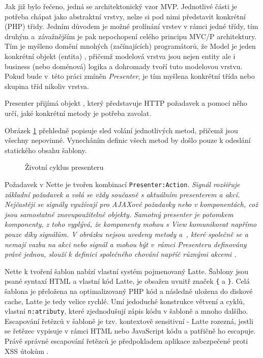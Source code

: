 Jak již bylo řečeno, jedná se architektonický vzor MVP. 
Jednotlivé části je potřeba chápat jako abstraktní vrstvy, nelze si pod nimi představit konkrétní (PHP) třidy. Jedním důvodem je možné prolínání vrstev v rámci jedné třídy, tím druhým a~závažnějším je pak nepochopení celého principu MVC/P architektury. Tím je myšleno domění mnohých (začínajících) programátorů, že Model je jeden konkrétní objekt (entita) \cite{MVCmodel}, přičemž modelová vrstva jsou nejen entity ale i business (nebo doménová) logika a dohromady tvoří tuto modelovou vrstvu. Pokud bude v~této práci zmíněn \textit{Presenter}, je tím myšlena konkrétní třída nebo skupina tříd nikoliv vrstva.


Presenter přijímá objekt , který představuje HTTP požadavek a pomocí něho určí, jaké konkrétní metody je potřeba zavolat. 

Obrázek \ref{fig:zivotniCyklusPresenteru} přehledně popisuje sled volání jednotlivých metod, přičemž jsou všechny nepovinné. Vynecháním definic všech metod by došlo pouze k odeslání statického obsahu šablony.

\begin{figure}[h]
		\centering \footnotesize {}\selectfont
		
		\normalsize \sffamily
		\captionsetup{width=\linewidth}
		\caption[Životní cyklus presenteru]{Životní cyklus presenteru \cite{NetteDocs}}
		\label{fig:zivotniCyklusPresenteru}
\end{figure}

Požadavek v Nette je tvořen kombinací \texttt{Presenter:Action}. \it{Signál} rozšiřuje základní požadavek a volá se vždy současně s aktuálním presenterem a akcí. Nejčastěji se signály využívají pro AJAXové požadavky nebo v komponentách, což jsou samostatné znovupoužitelné objekty. Samotný presenter je potomkem komponenty, z toho vyplývá, že komponenty mohou s View komunikovat napřímo pouze díky signálům. V obrázku nejsou uvedeny metody  a~, které společně se  a  nemají vazbu na \it{akci} nebo \it{signál} a mohou být v~rámci Presenteru definovány právě jednou, slouží k definici společného chování napříč různými akcemi \cite{NettePresentery}.

Nette k tvoření šablon nabízí vlastní systém pojmenovaný Latte. Šablony jsou psané syntaxí HTML a vlastní kód Latte, je obsažen uvnitř značek \texttt{\{} a \texttt{\}}. Celá šablona je přeložena na optimalizovaný PHP kód a následně uložena do diskové cache, Latte je tedy velice rychlé. Umí jedoduché konstrukce větvení a cyklů, vlastní \texttt{n:atributy}, které zjednodušují zápis kódu v šabloně a mnoho dalšího. Escapování řetězců v šabloně je tzv. kontextově sensitivní - Latte rozezná, jestli se řetězec vypisuje v rámci HTML nebo JavaScript kódu a patřičně ho escapuje. Právě správné escapování řetězců je předpokladem aplikace zabezpečené proti XSS útokům \cite{XssPrevention}\cite{Latte}.

